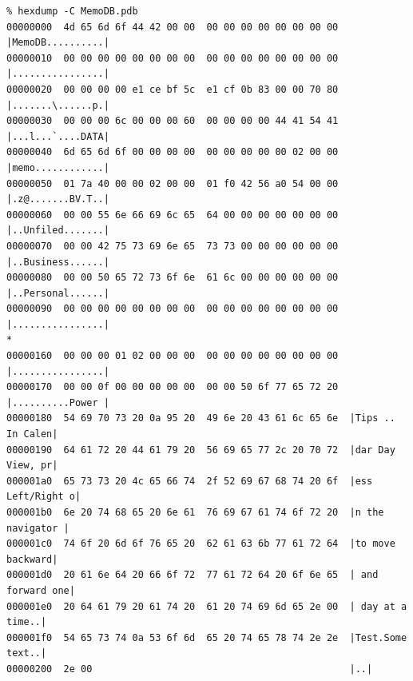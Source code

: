 \documentclass[a4paper,12pt,oneside]{scrartcl}
\begin{document}
\footnotesize
\begin{verbatim}
% hexdump -C MemoDB.pdb
00000000  4d 65 6d 6f 44 42 00 00  00 00 00 00 00 00 00 00  |MemoDB..........|
00000010  00 00 00 00 00 00 00 00  00 00 00 00 00 00 00 00  |................|
00000020  00 00 00 00 e1 ce bf 5c  e1 cf 0b 83 00 00 70 80  |.......\......p.|
00000030  00 00 00 6c 00 00 00 60  00 00 00 00 44 41 54 41  |...l...`....DATA|
00000040  6d 65 6d 6f 00 00 00 00  00 00 00 00 00 02 00 00  |memo............|
00000050  01 7a 40 00 00 02 00 00  01 f0 42 56 a0 54 00 00  |.z@.......BV.T..|
00000060  00 00 55 6e 66 69 6c 65  64 00 00 00 00 00 00 00  |..Unfiled.......|
00000070  00 00 42 75 73 69 6e 65  73 73 00 00 00 00 00 00  |..Business......|
00000080  00 00 50 65 72 73 6f 6e  61 6c 00 00 00 00 00 00  |..Personal......|
00000090  00 00 00 00 00 00 00 00  00 00 00 00 00 00 00 00  |................|
*
00000160  00 00 00 01 02 00 00 00  00 00 00 00 00 00 00 00  |................|
00000170  00 00 0f 00 00 00 00 00  00 00 50 6f 77 65 72 20  |..........Power |
00000180  54 69 70 73 20 0a 95 20  49 6e 20 43 61 6c 65 6e  |Tips .. In Calen|
00000190  64 61 72 20 44 61 79 20  56 69 65 77 2c 20 70 72  |dar Day View, pr|
000001a0  65 73 73 20 4c 65 66 74  2f 52 69 67 68 74 20 6f  |ess Left/Right o|
000001b0  6e 20 74 68 65 20 6e 61  76 69 67 61 74 6f 72 20  |n the navigator |
000001c0  74 6f 20 6d 6f 76 65 20  62 61 63 6b 77 61 72 64  |to move backward|
000001d0  20 61 6e 64 20 66 6f 72  77 61 72 64 20 6f 6e 65  | and forward one|
000001e0  20 64 61 79 20 61 74 20  61 20 74 69 6d 65 2e 00  | day at a time..|
000001f0  54 65 73 74 0a 53 6f 6d  65 20 74 65 78 74 2e 2e  |Test.Some text..|
00000200  2e 00                                             |..|
\end{verbatim}
\normalsize
\end{document}
